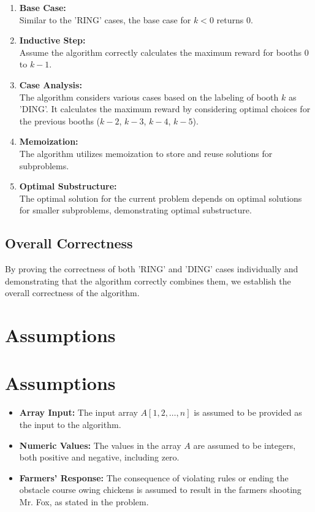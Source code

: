 \documentclass{article}
\begin{document}
\begin{enumerate}
    \item \textbf{Base Case:} \\
        Similar to the 'RING' cases, the base case for \(k < 0\) returns 0.
        
    \item \textbf{Inductive Step:} \\
        Assume the algorithm correctly calculates the maximum reward for booths \(0\) to \(k-1\).
        
    \item \textbf{Case Analysis:} \\
        The algorithm considers various cases based on the labeling of booth \(k\) as 'DING'. It calculates the maximum reward by considering optimal choices for the previous booths (\(k-2\), \(k-3\), \(k-4\), \(k-5\)).
        
    \item \textbf{Memoization:} \\
        The algorithm utilizes memoization to store and reuse solutions for subproblems.
        
    \item \textbf{Optimal Substructure:} \\
        The optimal solution for the current problem depends on optimal solutions for smaller subproblems, demonstrating optimal substructure.
\end{enumerate}

\subsection{Overall Correctness}

By proving the correctness of both 'RING' and 'DING' cases individually and demonstrating that the algorithm correctly combines them, we establish the overall correctness of the algorithm.


\section{Assumptions}

\section{Assumptions}

\begin{itemize}
    \item \textbf{Array Input:} The input array \(A[1, 2, \ldots, n]\) is assumed to be provided as the input to the algorithm.
    
    \item \textbf{Numeric Values:} The values in the array \(A\) are assumed to be integers, both positive and negative, including zero.
    
    \item \textbf{Farmers' Response:} The consequence of violating rules or ending the obstacle course owing chickens is assumed to result in the farmers shooting Mr. Fox, as stated in the problem.
\end{itemize}
\end{document}
